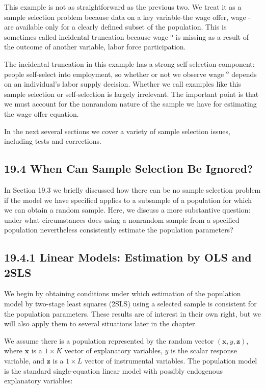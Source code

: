 \documentclass[10pt]{article}
\begin{document}
This example is not as straightforward as the previous two. We treat it as a sample selection problem because data on a key variable-the wage offer, wage - are available only for a clearly defined subset of the population. This is sometimes called incidental truncation because wage ${ }^{\mathrm{o}}$ is missing as a result of the outcome of another variable, labor force participation.

The incidental truncation in this example has a strong self-selection component: people self-select into employment, so whether or not we observe wage ${ }^{\mathrm{o}}$ depends on an individual's labor supply decision. Whether we call examples like this sample selection or self-selection is largely irrelevant. The important point is that we must account for the nonrandom nature of the sample we have for estimating the wage offer equation.

In the next several sections we cover a variety of sample selection issues, including tests and corrections.

\subsection*{19.4 When Can Sample Selection Be Ignored?}
In Section 19.3 we briefly discussed how there can be no sample selection problem if the model we have specified applies to a subsample of a population for which we can obtain a random sample. Here, we discuss a more substantive question: under what circumstances does using a nonrandom sample from a specified population nevertheless consistently estimate the population parameters?

\subsection*{19.4.1 Linear Models: Estimation by OLS and 2SLS}
We begin by obtaining conditions under which estimation of the population model by two-stage least squares (2SLS) using a selected sample is consistent for the population parameters. These results are of interest in their own right, but we will also apply them to several situations later in the chapter.

We assume there is a population represented by the random vector $(\mathbf{x}, y, \mathbf{z})$, where $\mathbf{x}$ is a $1 \times K$ vector of explanatory variables, $y$ is the scalar response variable, and $\mathbf{z}$ is a $1 \times L$ vector of instrumental variables. The population model is the standard single-equation linear model with possibly endogenous explanatory variables:
\end{document}
